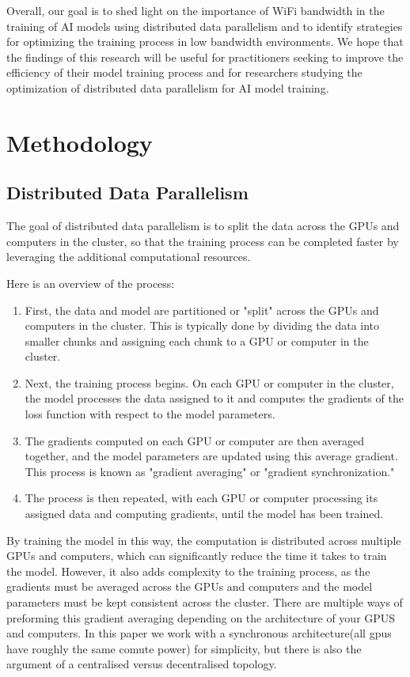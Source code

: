 \documentclass[10pt]{extarticle}
\begin{document}
Overall, our goal is to shed light on the importance of WiFi bandwidth in the training of AI models using distributed data parallelism and to identify strategies for optimizing the training process in low bandwidth environments. We hope that the findings of this research will be useful for practitioners seeking to improve the efficiency of their model training process and for researchers studying the optimization of distributed data parallelism for AI model training.

\section{Methodology}
\subsection*{Distributed Data Parallelism}
The goal of distributed data parallelism is to split the data across the GPUs and computers in the cluster, so that the training process can be completed faster by leveraging the additional computational resources.

Here is an overview of the process:

\begin{enumerate}
	\item First, the data and model are partitioned or "split" across the GPUs and computers in 			  the cluster. This is typically done by dividing the data into smaller chunks and 	  				   assigning each chunk to a GPU or computer in the cluster.
	\item Next, the training process begins. On each GPU or computer in the cluster, the model 				  processes the data assigned to it and computes the gradients of the loss function with 		  respect to the model parameters.
	\item The gradients computed on each GPU or computer are then averaged together, and the 				  model parameters are updated using this average gradient. This process is known as 				  "gradient averaging" or "gradient synchronization."
	\item The process is then repeated, with each GPU or computer processing its assigned data 				  and computing gradients, until the model has been trained.
\end{enumerate}

By training the model in this way, the computation is distributed across multiple GPUs and computers, which can significantly reduce the time it takes to train the model. However, it also adds complexity to the training process, as the gradients must be averaged across the GPUs and computers and the model parameters must be kept consistent across the cluster. There are multiple ways of preforming this gradient averaging depending on the architecture of your GPUS and computers. In this paper we work with a synchronous architecture(all gpus have roughly the same comute power) for simplicity, but there is also the argument of a centralised versus decentralised topology.
\end{document}
